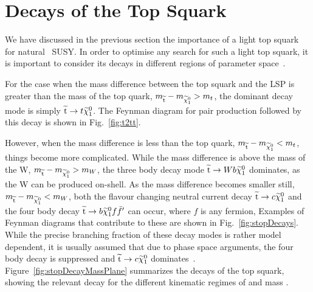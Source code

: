 

\section{Decays of the Top Squark}

We have discussed in the previous section the importance of a light top squark for natural ~\ac{SUSY}. 
In order to optimise any search for such a light top squark, it is important to consider its decays in different regions of parameter space~\cite{CompSUSY7,CompSUSY8}.

For the case when the mass difference between the top squark and the \ac{LSP} is greater than the mass of the top quark, 
$m_{\widetilde{{\rm t}}} - m_{\widetilde{\chi}^{0}_{1}} > m_{t}$, 
the dominant decay mode is simply 
$\widetilde{{\rm t}} \rightarrow t \widetilde{\chi}^{0}_{1}$.
The Feynman diagram for \sTop{} pair production followed by this decay is shown in Fig.~\ref{fig:t2tt}.

However, when the mass difference is less than the top quark, 
$m_{\widetilde{{\rm t}}} - m_{\widetilde{\chi}^{0}_{1}} < m_{t}$, 
things become more complicated. 
While the mass difference is above the mass of the W, 
$m_{\widetilde{{\rm t}}} - m_{\widetilde{\chi}^{0}_{1}} > m_{W}$, 
the three body decay mode $\widetilde{{\rm t}} \rightarrow W b \widetilde{\chi}^{0}_{1}$ dominates, as the W can be produced on-shell.
As the mass difference becomes smaller still, 
$m_{\widetilde{{\rm t}}} - m_{\widetilde{\chi}^{0}_{1}} < m_{W}$,
both the flavour changing neutral current decay 
$\widetilde{{\rm t}} \rightarrow c \widetilde{\chi}^{0}_{1}$ 
and the four body decay 
$\widetilde{{\rm t}} \rightarrow b \widetilde{\chi}^{0}_{1} f \bar{f}'$ can occur, where $f$ is any fermion, 
Examples of Feynman diagrams that contribute to these are shown in Fig.~\ref{fig:stopDecays}.
While the precise branching fraction of these decay modes is rather model dependent, it is usually assumed that due to phase space arguments, the four body decay is suppressed and $\widetilde{{\rm t}} \rightarrow c \widetilde{\chi}^{0}_{1}$ dominates~\cite{CompSUSY7}.
Figure~\ref{fig:stopDecayMassPlane} summarizes the decays of the top squark, showing the relevant decay for the different kinematic regimes of \sTop{} and \chiOneZero mass .

